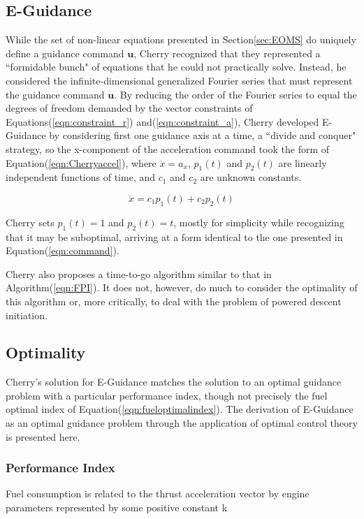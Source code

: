 \subsection{E-Guidance}
While the set of non-linear equations presented in Section\:\ref{sec:EOMS} do uniquely define a guidance command $\bm{u}$, Cherry recognized that they represented a ``formidable bunch" of equations that he could not practically solve. Instead, he considered the infinite-dimensional generalized Fourier series that must represent the guidance command $\bm{u}$. By reducing the order of the Fourier series to equal the degrees of freedom demanded by the vector constraints of Equations\:(\ref{eqn:constraint_r}) and\:(\ref{eqn:constraint_a}), Cherry developed E-Guidance by considering first one guidance axis at a time, a ``divide and conquer" strategy, so the x-component of the acceleration command took the form of Equation\:(\ref{eqn:Cherryaccel}), where $\ddot{x} = a_x$, $p_1(t)$ and $p_2(t)$ are linearly independent functions of time, and $c_1$ and $c_2$ are unknown constants.

\begin{equation}
\label{eqn:Cherryaccel}
\ddot{x} = c_1p_1(t) + c_2p_2(t)
\end{equation}

Cherry sets $p_1(t) = 1$ and $p_2(t) = t$, mostly for simplicity while recognizing that it may be suboptimal, arriving at a form identical to the one presented in Equation\:(\ref{eqn:command}). 

Cherry also proposes a time-to-go algorithm similar to that in Algorithm\:(\ref{eqn:FPI}). It does not, however, do much to consider the optimality of this algorithm or, more critically, to deal with the problem of powered descent initiation.

\subsection{Optimality} \label{sec:optimality}
Cherry's solution for E-Guidance matches the solution to an optimal guidance problem with a particular performance index, though not precisely the fuel optimal index of Equation\:(\ref{eqn:fueloptimalindex}). The derivation of E-Guidance as an optimal guidance problem through the application of optimal control theory is presented here.

\subsubsection{Performance Index}
Fuel consumption is related to the thrust acceleration vector by engine parameters represented by some positive constant k

